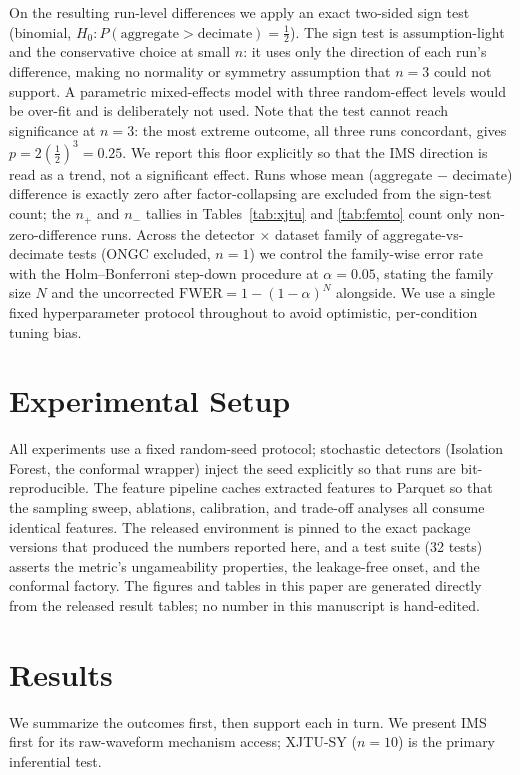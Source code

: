 \documentclass[IJPHM, 2026, 0]{PHMSociety}
\begin{document}
On the resulting run-level differences we apply an exact two-sided sign test (binomial, $H_0 : P(\text{aggregate} > \text{decimate}) = \tfrac{1}{2}$). The sign test is assumption-light and the conservative choice at small $n$: it uses only the direction of each run's difference, making no normality or symmetry assumption that $n=3$ could not support. A parametric mixed-effects model with three random-effect levels would be over-fit and is deliberately not used. Note that the test cannot reach significance at $n=3$: the most extreme outcome, all three runs concordant, gives $p = 2(\tfrac{1}{2})^3 = 0.25$. We report this floor explicitly so that the IMS direction is read as a trend, not a significant effect. Runs whose mean (aggregate $-$ decimate) difference is exactly zero after factor-collapsing are excluded from the sign-test count; the $n_+$ and $n_-$ tallies in Tables~\ref{tab:xjtu} and \ref{tab:femto} count only non-zero-difference runs. Across the detector $\times$ dataset family of aggregate-vs-decimate tests (ONGC excluded, $n=1$) we control the family-wise error rate with the Holm--Bonferroni step-down procedure at $\alpha=0.05$, stating the family size $N$ and the uncorrected $\text{FWER} = 1 - (1-\alpha)^N$ alongside. We use a single fixed hyperparameter protocol throughout to avoid optimistic, per-condition tuning bias.


\section{Experimental Setup}
All experiments use a fixed random-seed protocol; stochastic detectors (Isolation Forest, the conformal wrapper) inject the seed explicitly so that runs are bit-reproducible. The feature pipeline caches extracted features to Parquet so that the sampling sweep, ablations, calibration, and trade-off analyses all consume identical features. The released environment is pinned to the exact package versions that produced the numbers reported here, and a test suite (32 tests) asserts the metric's ungameability properties, the leakage-free onset, and the conformal factory. The figures and tables in this paper are generated directly from the released result tables; no number in this manuscript is hand-edited.


\section{Results}
\label{sec:results}
We summarize the outcomes first, then support each in turn. We present IMS first for its raw-waveform mechanism access; XJTU-SY ($n=10$) is the primary inferential test.
\end{document}

